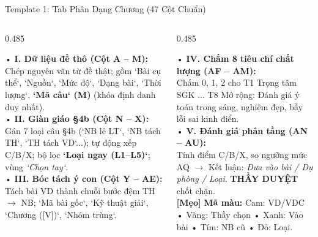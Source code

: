 \documentclass[aspectratio=169,11pt]{beamer}
\begin{document}
\begin{frame}{Template 1: Tab Phân Dạng Chương (47 Cột Chuẩn)}
  \vspace{-3pt}
  \begin{columns}[T]
    \begin{column}{0.485\textwidth}
      \begin{tcolorbox}[slidecard, top=3pt, bottom=3pt, title={Phân Khu I, II, III: Thiết Kế \& Giàn Giáo}]
        \scriptsize
        • \textbf{\color{brand}I. Dữ liệu đề thô (Cột A -- M):}\\
        Chép nguyên văn từ đề thật; gồm `Bài cụ thể`, `Nguồn`, `Mức độ`, `Dạng bài`, `Thời lượng`, \textbf{`Mã câu` (M)} (khóa định danh duy nhất).\\[3pt]
        • \textbf{\color{accent}II. Giàn giáo §4b (Cột N -- X):}\\
        Gán 7 loại câu §4b (`NB lẻ LT`, `NB tách TH`, `TH tách VD`...); tự động xếp C/B/X; bộ lọc \textbf{`Loại ngay (L1--L5)`}; vùng \textit{`Chọn tay`}.\\[3pt]
        • \textbf{III. Bóc tách ý con (Cột Y -- AE):}\\
        Tách bài VD thành chuỗi bước đệm TH $\to$ NB; `Mã bài gốc`, `Kỹ thuật giải`, `Chương ([V])`, `Nhóm trùng`.
      \end{tcolorbox}
    \end{column}

    \begin{column}{0.485\textwidth}
      \begin{tcolorbox}[successcard, top=3pt, bottom=3pt, title={Phân Khu IV, V: Đánh Giá \& Kết Luận}]
        \scriptsize
        • \textbf{\color{success}IV. Chấm 8 tiêu chí chất lượng (AF -- AM):}\\
        Chấm 0, 1, 2 cho T1 Trọng tâm SGK $\dots$ T8 Mở rộng: Đánh giá ý toán trong sáng, nghiệm đẹp, bẫy lỗi sai kinh điển.\\[3pt]
        • \textbf{\color{danger}V. Đánh giá phân tầng (AN -- AU):}\\
        Tính điểm C/B/X, so ngưỡng mức AQ $\to$ Kết luận: \textit{Đưa vào bài / Dự phòng / Loại}. \textbf{THẦY DUYỆT} chốt chặn.\\[4pt]
        \tcblower
        \tiny
        \textbf{[Mẹo]} \textbf{Mã màu:} {\color{accent}Cam: VD/VDC} • {\color{brand}Vàng: Thầy chọn} • {\color{success}Xanh: Vào bài} • {\color{purple}Tím: NB cũ} • {\color{danger}Đỏ: Loại}.
      \end{tcolorbox}
    \end{column}
  \end{columns}
\end{frame}
\end{document}
